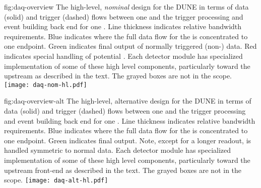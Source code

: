 \begin{dunefigure}{fig:daq-overview}
  {The high-level, \textit{nominal} design for the DUNE   in
    terms of data (solid) and trigger (dashed) flows between one
      and the trigger processing and event
    building back end for one . 
    Line thickness indicates relative bandwidth requirements.
    Blue indicates where the full data flow for the  is
    concentrated to one endpoint.
    Green indicates final output of normally triggered (non-) data.
    Red indicates special handling of potential . 
    Each detector module has specialized implementation of some of these
    high level components, particularly toward the upstream 
    as described in the text. 
    The grayed boxes are not in the  scope.
  }
  \texttt{[image: daq-nom-hl.pdf]}%
\end{dunefigure}

\begin{dunefigure}{fig:daq-overview-alt}
  {The high-level, alternative design for the DUNE   in
    terms of data (solid) and trigger (dashed) flows between one
      and the trigger processing and event
    building back end for one . 
    Line thickness indicates relative bandwidth requirements.
    Blue indicates where the full data flow for the  is
    concentrated to one endpoint.
    Green indicates final output.
    Note, except for a longer readout,  is handled
    symmetric to normal data.
    Each detector module has specialized implementation of some of
    these high level components, particularly toward the upstream
    front-end as described in the text. 
    The grayed boxes are not in the  scope.
  }
  \texttt{[image: daq-alt-hl.pdf]}%
\end{dunefigure}

